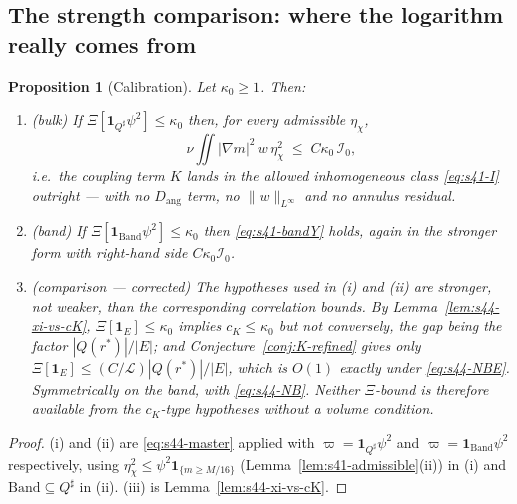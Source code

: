 \documentclass[11pt]{article}
\newtheorem{proposition}[theorem]{Proposition}
\theoremstyle{definition}
\theoremstyle{remark}
\begin{document}
\subsection{The strength comparison: where the logarithm really comes from}
\label{subsec:s44-strength}

\begin{proposition}[Calibration]\label{prop:s44-calibration}
  Let $\kappa_0\geq1$. Then:
  \begin{enumerate}[label=(\roman*)]
    \item \textup{(bulk)} If $\Xi[\mathbf{1}_{Q^\sharp}\psi^2]\leq\kappa_0$
      then, for every admissible $\eta_\chi$,
      \[
        \nu\iint|\nabla m|^2\,w\,\eta_\chi^2 \;\leq\; C\kappa_0\,\mathcal{I}_0 ,
      \]
      i.e.\ the coupling term $K$ lands in the allowed inhomogeneous class
      \eqref{eq:s41-I} outright --- with no $D_{\mathrm{ang}}$ term, no
      $\|w\|_{L^\infty}$ and no annulus residual.
    \item \textup{(band)} If
      $\Xi[\mathbf{1}_{\mathrm{Band}}\psi^2]\leq\kappa_0$ then
      \eqref{eq:s41-bandY} holds, again in the stronger form with right-hand
      side $C\kappa_0\mathcal{I}_0$.
    \item \textup{(comparison --- corrected)} The hypotheses used in (i) and
      (ii) are \emph{stronger}, not weaker, than the corresponding
      correlation bounds. By Lemma~\ref{lem:s44-xi-vs-cK},
      $\Xi[\mathbf{1}_E]\leq\kappa_0$ implies $c_K\leq\kappa_0$ but not
      conversely, the gap being the factor $|Q(r^*)|/|E|$; and
      Conjecture~\ref{conj:K-refined} gives only
      $\Xi[\mathbf{1}_E]\leq(C/\mathcal{L})|Q(r^*)|/|E|$, which is $O(1)$
      exactly under \eqref{eq:s44-NBE}. Symmetrically on the band, with
      \eqref{eq:s44-NB}. Neither $\Xi$-bound is therefore available from the
      $c_K$-type hypotheses without a volume condition.
  \end{enumerate}
\end{proposition}
\begin{proof}
  (i) and (ii) are \eqref{eq:s44-master} applied with
  $\varpi=\mathbf{1}_{Q^\sharp}\psi^2$ and
  $\varpi=\mathbf{1}_{\mathrm{Band}}\psi^2$ respectively, using
  $\eta_\chi^2\leq\psi^2\mathbf{1}_{\{m\geq M/16\}}$
  (Lemma~\ref{lem:s41-admissible}(ii)) in (i) and
  $\mathrm{Band}\subseteq Q^\sharp$ in (ii). (iii) is
  Lemma~\ref{lem:s44-xi-vs-cK}.
\end{proof}
\end{document}
